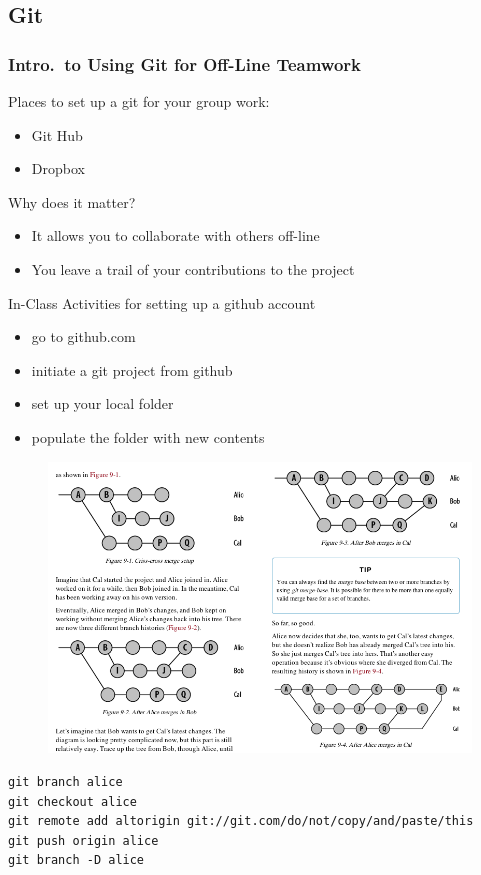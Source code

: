 \documentclass[hyperref={colorlinks=false},handout,10pt]{beamer}
\let\olditem\item
\renewcommand{\item}{\setlength{\itemsep}{0.5\baselineskip}\olditem}
\begin{document}
\subsection{Git} 
\begin{frame}
    \frametitle{Intro.\ to Using Git for Off-Line Teamwork}
    Places to set up a git for your group work: 
    \begin{itemize}
        \item Git Hub
        \item Dropbox
    \end{itemize}
    Why does it matter?
    \begin{itemize}
        \item It allows you to collaborate with others off-line
        \item You leave a trail of your contributions to the project
    \end{itemize}
    \begin{block}
        {In-Class Activities for setting up a github account}
        \begin{itemize}
            \item go to github.com
            \item initiate a git project from github
            \item set up your local folder 
            \item populate the folder with new contents
        \end{itemize}
    \end{block}
    \begin{figure}
        \begin{center}
            \includegraphics[width=\textwidth]{images/gitmergeexample.png}
        \end{center}
    \end{figure}
    \begin{lstlisting}
git branch alice 
git checkout alice
git remote add altorigin git://git.com/do/not/copy/and/paste/this
git push origin alice
git branch -D alice
    \end{lstlisting}
\end{frame}
\end{document}

